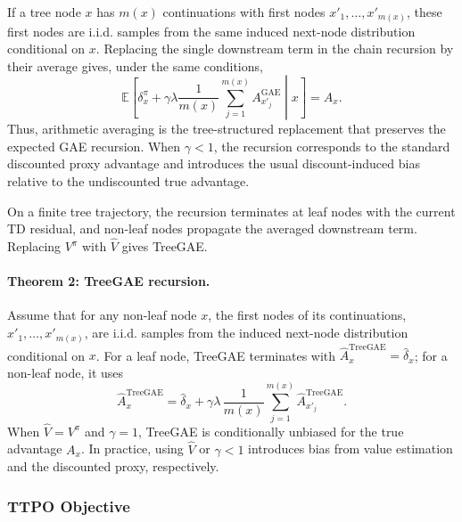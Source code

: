 If a tree node $x$ has $m(x)$ continuations with first nodes $x'_1,\ldots,x'_{m(x)}$, these first nodes are i.i.d. samples from the same induced next-node distribution conditional on $x$. Replacing the single downstream term in the chain recursion by their average gives, under the same conditions,
\[
\mathbb{E}\left[
\delta^\pi_x+\gamma\lambda
\frac{1}{m(x)}\sum_{j=1}^{m(x)}A^{\mathrm{GAE}}_{x'_j}
\middle|x\right]
=
A_x.
\]
Thus, arithmetic averaging is the tree-structured replacement that preserves the expected GAE recursion. When $\gamma<1$, the recursion corresponds to the standard discounted proxy advantage and introduces the usual discount-induced bias relative to the undiscounted true advantage.

On a finite tree trajectory, the recursion terminates at leaf nodes with the current TD residual, and non-leaf nodes propagate the averaged downstream term. Replacing $V^\pi$ with $\hat V$ gives TreeGAE.

\paragraph{Theorem 2: TreeGAE recursion.}
Assume that for any non-leaf node $x$, the first nodes of its continuations, $x'_1,\ldots,x'_{m(x)}$, are i.i.d. samples from the induced next-node distribution conditional on $x$. For a leaf node, TreeGAE terminates with $\hat A^{\mathrm{TreeGAE}}_x=\hat\delta_x$; for a non-leaf node, it uses
\begin{equation}
\label{eq:treegae}
\hat A^{\mathrm{TreeGAE}}_x
=
\hat\delta_x
+
\gamma\lambda\,\frac{1}{m(x)}
\sum_{j=1}^{m(x)}
\hat A^{\mathrm{TreeGAE}}_{x'_j}.
\end{equation}
When $\hat V=V^\pi$ and $\gamma=1$, TreeGAE is conditionally unbiased for the true advantage $A_x$. In practice, using $\hat V$ or $\gamma<1$ introduces bias from value estimation and the discounted proxy, respectively.

\subsubsection{TTPO Objective}

